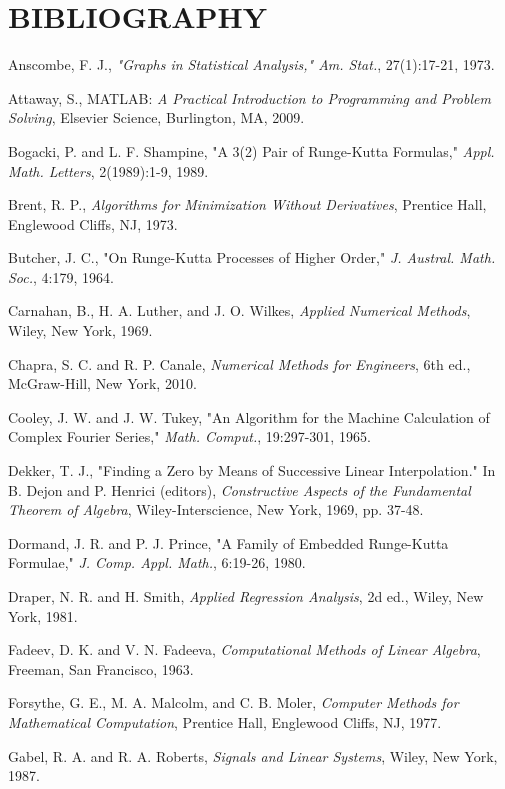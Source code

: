 \documentclass[../main.tex]{subfiles}
\begin{document}
    
\chapter*{BIBLIOGRAPHY}

\begin{multicols}{2}
    Anscombe, F. J., \textit{"Graphs in Statistical Analysis," Am. Stat.},
    27(1):17-21, 1973.

    Attaway, S., MATLAB: \textit{A Practical Introduction to Programming and Problem Solving}, Elsevier Science,
    Burlington, MA, 2009.

    Bogacki, P. and L. F. Shampine, "A 3(2) Pair of Runge-Kutta
    Formulas," \textit{Appl. Math. Letters}, 2(1989):1-9, 1989.

    Brent, R. P., \textit{Algorithms for Minimization Without
    Derivatives}, Prentice Hall, Englewood Cliffs, 
    NJ, 1973.

    Butcher, J. C., "On Runge-Kutta Processes of Higher
    Order," \textit{J. Austral. Math. Soc.}, 4:179, 1964.

    Carnahan, B., H. A. Luther, and J. O. Wilkes, \textit{Applied
    Numerical Methods}, Wiley, New York, 1969.

    Chapra, S. C. and R. P. Canale, \textit{Numerical Methods for
    Engineers}, 6th ed., McGraw-Hill, New York, 2010.

    Cooley, J. W. and J. W. Tukey, "An Algorithm for the
    Machine Calculation of Complex Fourier Series,"
    \textit{Math. Comput.}, 19:297-301, 1965.

    Dekker, T. J., "Finding a Zero by Means of Successive
    Linear Interpolation." In B. Dejon and P. Henrici
    (editors), \textit{Constructive Aspects of the Fundamental
    Theorem of Algebra}, Wiley-Interscience, New York,
    1969, pp. 37-48.

    Dormand, J. R. and P. J. Prince, "A Family of Embedded
    Runge-Kutta Formulae," \textit{J. Comp. Appl. Math.},
    6:19-26, 1980.

    Draper, N. R. and H. Smith, \textit{Applied Regression Analysis},
    2d ed., Wiley, New York, 1981.

    Fadeev, D. K. and V. N. Fadeeva, \textit{Computational Methods
    of Linear Algebra}, Freeman, San Francisco, 1963.

    Forsythe, G. E., M. A. Malcolm, and C. B. Moler, \textit{Computer Methods for Mathematical Computation},
    Prentice Hall, Englewood Cliffs, NJ, 1977.

    Gabel, R. A. and R. A. Roberts, \textit{Signals and Linear
    Systems}, Wiley, New York, 1987.


\end{multicols}
\end{document}
